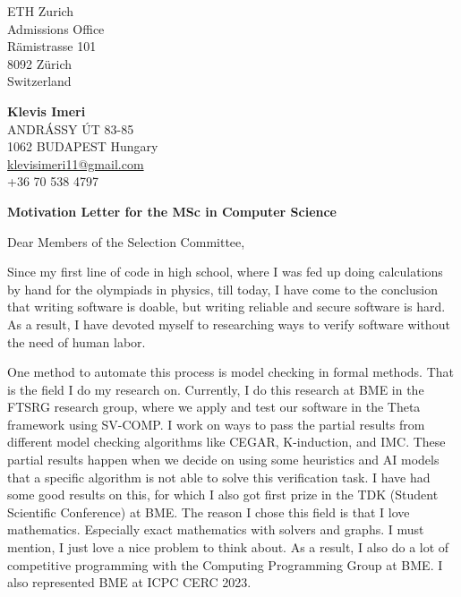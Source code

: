 \documentclass{article}
\begin{document}
\noindent
\begin{minipage}[t]{0.5\textwidth} %
    ETH Zurich \\
    Admissions Office \\
    Rämistrasse 101 \\
    8092 Zürich \\
    Switzerland
\end{minipage}%
\hfill %
\begin{minipage}[t]{0.5\textwidth} %
    \begin{flushright}
        \textbf{Klevis Imeri} \\
        ANDRÁSSY ÚT 83-85 \\
        1062 BUDAPEST Hungary \\
        \href{mailto:klevisimeri11@gmail.com}{klevisimeri11@gmail.com} \\ %
        +36 70 538 4797
    \end{flushright}
\end{minipage}

\vspace{0.8cm} %

\textbf{Motivation Letter for the MSc in Computer Science}

\vspace{0.5cm} %

Dear Members of the Selection Committee,

\vspace{0.5cm}

Since my first line of code in high school, where I was fed up doing
calculations by hand for the olympiads in physics, till
today, I have come to the conclusion that writing software is doable, but
writing reliable and secure software is hard. As a result, I have devoted
myself to researching ways to verify software without the need of human
labor.

One method to automate this process is model checking in formal methods.
That is the field I do my research on. Currently, I do this research at BME in the
FTSRG research group, where we apply and test our software in the Theta
framework using SV-COMP. I work on ways to pass the partial results from
different model checking algorithms like CEGAR, K-induction, and IMC. These
partial results happen when we decide on using some heuristics and AI models that
a specific algorithm is not able to solve this verification task. I have had
some good results on this, for which I also got first prize in the TDK (Student Scientific Conference) at BME. The reason I chose this field is that I love
mathematics. Especially exact mathematics with solvers and graphs. I must
mention, I just love a nice problem to think about. As a result, I also do a lot
of competitive programming with the Computing Programming Group at BME.
I also represented BME at ICPC CERC 2023.
\end{document}

